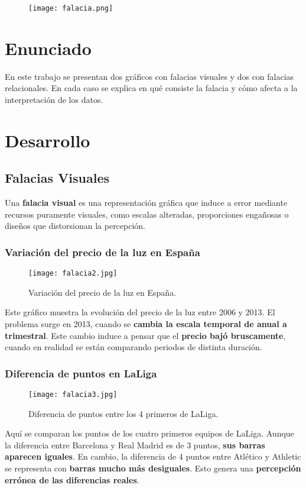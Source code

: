 \documentclass[12pt,a4paper]{article}
\title{\tituloTrabajo}
\author{\miNombre}
\date{\today}
\begin{document}
\maketitle
\begin{figure}[h]
    \centering
    \texttt{[image: falacia.png]}
    \label{fig:portada}
\end{figure}

\tableofcontents
\newpage

\section{Enunciado}
En este trabajo se presentan dos gráficos con falacias visuales y dos con falacias relacionales. 
En cada caso se explica en qué consiste la falacia y cómo afecta a la interpretación de los datos.

\section{Desarrollo}

\subsection{Falacias Visuales}
Una \textbf{falacia visual} es una representación gráfica que induce a error mediante recursos puramente visuales, 
como escalas alteradas, proporciones engañosas o diseños que distorsionan la percepción.

\subsubsection{Variación del precio de la luz en España}
\begin{figure}[h]
    \centering
    \texttt{[image: falacia2.jpg]}
    \caption{Variación del precio de la luz en España.}
    \label{fig:grafico2}
\end{figure}
Este gráfico muestra la evolución del precio de la luz entre 2006 y 2013. 
El problema surge en 2013, cuando se \textbf{cambia la escala temporal de anual a trimestral}. 
Este cambio induce a pensar que el \textbf{precio bajó bruscamente}, cuando en realidad se están comparando periodos de distinta duración.

\newpage

\subsubsection{Diferencia de puntos en LaLiga}
\begin{figure}[h]
    \centering
    \texttt{[image: falacia3.jpg]}
    \caption{Diferencia de puntos entre los 4 primeros de LaLiga.}
    \label{fig:grafico3}
\end{figure}
Aquí se comparan los puntos de los cuatro primeros equipos de LaLiga. 
Aunque la diferencia entre Barcelona y Real Madrid es de 3 puntos, \textbf{sus barras aparecen iguales}. 
En cambio, la diferencia de 4 puntos entre Atlético y Athletic se representa con \textbf{barras mucho más desiguales}. 
Esto genera una \textbf{percepción errónea de las diferencias reales}.
\end{document}
